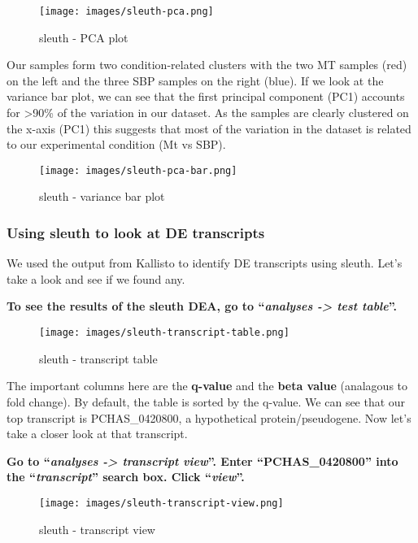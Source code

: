 \documentclass[11pt]{article}
\begin{document}
    \begin{figure}[!h]
\centering
\texttt{[image: images/sleuth-pca.png]}
\caption{sleuth - PCA plot}
\end{figure}

    Our samples form two condition-related clusters with the two MT samples
(red) on the left and the three SBP samples on the right (blue). If we
look at the variance bar plot, we can see that the first principal
component (PC1) accounts for \textgreater90\% of the variation in our
dataset. As the samples are clearly clustered on the x-axis (PC1) this
suggests that most of the variation in the dataset is related to our
experimental condition (Mt vs SBP).

    \begin{figure}[!h]
\centering
\texttt{[image: images/sleuth-pca-bar.png]}
\caption{sleuth - variance bar plot}
\end{figure}

    \hypertarget{using-sleuth-to-look-at-de-transcripts}{%
\subsubsection{Using sleuth to look at DE
transcripts}\label{using-sleuth-to-look-at-de-transcripts}}

We used the output from Kallisto to identify DE transcripts using
sleuth. Let's take a look and see if we found any.

\textbf{To see the results of the sleuth DEA, go to ``\textit{analyses
-\textgreater{} test table}''.}

    \begin{figure}[!h]
\centering
\texttt{[image: images/sleuth-transcript-table.png]}
\caption{sleuth - transcript table}
\end{figure}

    The important columns here are the \textbf{q-value} and the \textbf{beta
value} (analagous to fold change). By default, the table is sorted by
the q-value. We can see that our top transcript is PCHAS\_0420800, a
hypothetical protein/pseudogene. Now let's take a closer look at that
transcript.

\newpage

\textbf{Go to ``\textit{analyses -\textgreater{} transcript view}''. Enter
``PCHAS\_0420800'' into the ``\textit{transcript}'' search box. Click
``\textit{view}''.}

    \begin{figure}[!h]
\centering
\texttt{[image: images/sleuth-transcript-view.png]}
\caption{sleuth - transcript view}
\end{figure}
\end{document}
